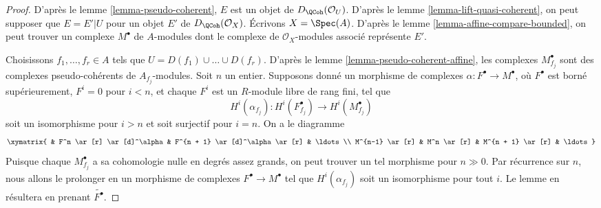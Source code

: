 \begin{proof}
D'après le lemme \ref{lemma-pseudo-coherent}, $E$ est un objet de
$D_\QCoh(\mathcal{O}_U)$. D'après le
lemme \ref{lemma-lift-quasi-coherent},
on peut supposer que $E = E'|U$ pour un objet $E'$ de
$D_\QCoh(\mathcal{O}_X)$.
Écrivons $X = \Spec(A)$. D'après le lemme \ref{lemma-affine-compare-bounded},
on peut trouver un complexe $M^\bullet$ de $A$-modules dont le
complexe de $\mathcal{O}_X$-modules associé représente $E'$.

\medskip\noindent
Choisissons $f_1, \ldots, f_r \in A$ tels que $U = D(f_1) \cup \ldots \cup D(f_r)$.
D'après le lemme \ref{lemma-pseudo-coherent-affine}, les complexes
$M^\bullet_{f_j}$ sont des complexes pseudo-cohérents de $A_{f_j}$-modules.
Soit $n$ un entier. Supposons donné un morphisme de complexes
$\alpha : F^\bullet \to M^\bullet$, où $F^\bullet$ est
borné supérieurement, $F^i = 0$ pour $i < n$, et chaque $F^i$ est un
$R$-module libre de rang fini, tel que
$$
H^i(\alpha_{f_j}) : H^i(F^\bullet_{f_j}) \to H^i(M^\bullet_{f_j})
$$
soit un isomorphisme pour $i > n$ et soit surjectif pour $i = n$. On a le diagramme
$$
\xymatrix{
& F^n \ar[r] \ar[d]^\alpha & F^{n + 1} \ar[d]^\alpha \ar[r] & \ldots \\
M^{n-1} \ar[r] & M^n \ar[r] & M^{n + 1} \ar[r] & \ldots
}
$$
Puisque chaque $M^\bullet_{f_j}$ a sa cohomologie nulle
en degrés assez grands, on peut trouver un tel morphisme pour $n \gg 0$.
Par récurrence sur $n$, nous allons le prolonger en un morphisme
de complexes $F^\bullet \to M^\bullet$
tel que $H^i(\alpha_{f_j})$ soit un isomorphisme
pour tout $i$. Le lemme en résultera en prenant $\widetilde{F^\bullet}$.


\end{proof}
